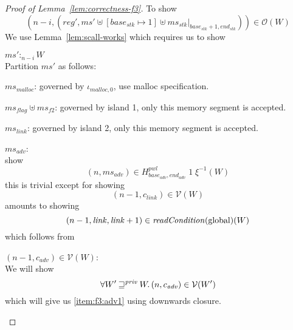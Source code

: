 \documentclass[a4paper]{article}
\newcommand{\var}[1]{\mathit{#1}}
\newcommand{\hs}{\var{ms}}
\newcommand{\ms}{\hs}
\newcommand{\start}{\var{base}}
\newcommand{\addrend}{\var{end}}
\newcommand{\reg}{\var{reg}}
\newcommand{\heap}{\var{mem}}
\newcommand{\adv}{\var{adv}}
\newcommand{\link}{\var{link}}
\newcommand{\stk}{\var{stk}}
\newcommand{\flag}{\var{flag}}
\newcommand{\pwl}{\var{pwl}}
\newcommand{\plainfun}[2]{
  \ifthenelse{\equal{#2}{}}
  {\mathit{#1}}
  {\mathit{#1}(#2)}
}
\newcommand{\readCond}[1]{\plainfun{readCondition}{#1}}
\newcommand{\futurestr}{\mathbin{\sqsupseteq}^{\var{priv}}}
\newcommand{\heapSat}[3][\heap]{#1 :_{#2} #3}
\newcommand{\memSat}[3][n]{\heapSat[#2]{#1}{#3}}
\newcommand{\codelabel}[1]{\mathit{#1}}
\newcommand{\malloc}{\codelabel{malloc}}
\newcommand{\asmType}{\plaindom{AsmType}}
\newcommand{\plaindom}[1]{\mathrm{#1}}
\newcommand{\intr}[2]{\mathcal{#1}}
\newcommand{\valueintr}[1]{\intr{V}{#1}}
\newcommand{\stdvr}{\valueintr{\asmType}}
\newcommand{\observations}{\mathcal{O}}
\newcommand{\npair}[2][n]{\left(#1,#2 \right)}
\newcommand{\plainperm}[1]{\mathrm{#1}}
\newcommand{\glob}{\plainperm{global}}
\begin{document}
\begin{proof}[Proof of Lemma~\ref{lem:correctness-f3}]
To show
\[
  \npair[n-i]{(\reg',\ms' \uplus [\start_\stk \mapsto 1] \uplus \ms_\stk |_{\start_\stk+1,\addrend_\stk})} \in \observations(W)
\]
We use Lemma~\ref{lem:scall-works} which requires us to show
\begin{enumproof}
  \item $\memSat[n-i]{\ms'}{W}$ \\
    Partition $\ms'$ as follows:
    \begin{enumproof}
      \item $\ms_\malloc$: governed by $\iota_{\malloc,0}$, use malloc specification.
      \item $\ms_\flag \uplus \ms_{f2}$: governed by island 1, only this memory segment is accepted.
      \item $\ms_\link$: governed by island 2, only this memory segment is accepted.
      \item $\ms_\adv$:\\
        show
        \[
          \npair[n]{\ms_\adv} \in H^\pwl_{\start_\adv,\addrend_\adv}\;1\;\xi^{-1}(W)
        \]
        this is trivial except for showing
        \[
          \npair[n-1]{c_\link} \in \stdvr(W)
        \]
        amounts to showing
        \[
          \npair[n-1]{\link,\link+1} \in \readCond{}(\glob)(W)
        \]
        which follows from
        \begin{enumproof}
          \item $\npair[n-1]{c_\adv} \in \stdvr(W)$: \label{item:f3:adv1}\\
            We will show
            \begin{equation}
              \label{eq:f3:adv-in-stder}
              \forall W' \futurestr W \ldotp \npair{c_\adv} \in \stdvr(W')
            \end{equation}
            which will give us \ref{item:f3:adv1} using downwards closure.


\end{enumproof}
\end{enumproof}
\end{enumproof}
\end{proof}
\end{document}
